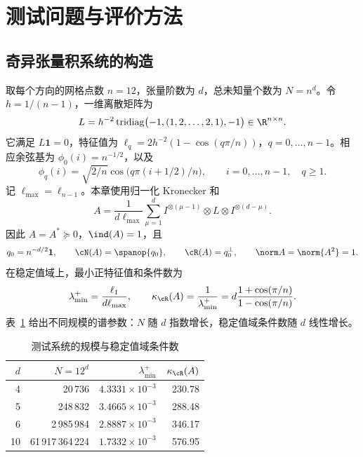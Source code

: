 \section{测试问题与评价方法}\label{sec:exp-setup}

\subsection{奇异张量积系统的构造}

取每个方向的网格点数 $n=12$，张量阶数为 $d$，总未知量个数为 $N=n^d$。令 $h=1/(n-1)$，一维离散矩阵为
\begin{equation}\label{eq:exp-L}
 L=h^{-2}\operatorname{tridiag}\bigl(-1,(1,2,\ldots,2,1),-1\bigr)
 \in\R^{n\times n}.
\end{equation}
它满足 $L\mathbf1=0$，特征值为 $\ell_q=2h^{-2}(1-\cos(q\pi/n))$，$q=0,\ldots,n-1$。相应余弦基为 $\phi_0(i)=n^{-1/2}$，以及
\[
 \phi_q(i)=\sqrt{2/n}\cos\bigl(q\pi(i+1/2)/n\bigr),
 \qquad i=0,\ldots,n-1,\quad q\ge1.
\]
记 $\ell_{\max}=\ell_{n-1}$。本章使用归一化 Kronecker 和
\begin{equation}\label{eq:exp-A}
 A=\frac1{d\ell_{\max}}\sum_{\mu=1}^d
 I^{\otimes(\mu-1)}\otimes L\otimes I^{\otimes(d-\mu)}.
\end{equation}
因此 $A=A^*\succeq0$，$\ind(A)=1$，且
\begin{equation}\label{eq:exp-range}
 q_0=n^{-d/2}\mathbf1,\qquad
 \cN(A)=\spanop\{q_0\},\qquad
 \cR(A)=q_0^\perp,\qquad \norm A=\norm{A^2}=1.
\end{equation}
在稳定值域上，最小正特征值和条件数为
\begin{equation}\label{eq:exp-range-cond}
 \lambda_{\min}^+=\frac{\ell_1}{d\ell_{\max}},\qquad
 \kappa_{\cR}(A)=\frac1{\lambda_{\min}^+}
 =d\frac{1+\cos(\pi/n)}{1-\cos(\pi/n)}.
\end{equation}
表~\ref{tab:exp-size} 给出不同规模的谱参数：$N$ 随 $d$ 指数增长，稳定值域条件数随 $d$ 线性增长。

\begin{table}[H]
\centering\small
\caption{测试系统的规模与稳定值域条件数}\label{tab:exp-size}
\begin{tabular}{rrrr}
\toprule
$d$ & $N=12^d$ & $\lambda_{\min}^+$ & $\kappa_{\cR}(A)$\\
\midrule
4&20\,736&$4.3331\times10^{-3}$&230.78\\
5&248\,832&$3.4665\times10^{-3}$&288.48\\
6&2\,985\,984&$2.8887\times10^{-3}$&346.17\\
10&61\,917\,364\,224&$1.7332\times10^{-3}$&576.95\\
\bottomrule
\end{tabular}
\end{table}

